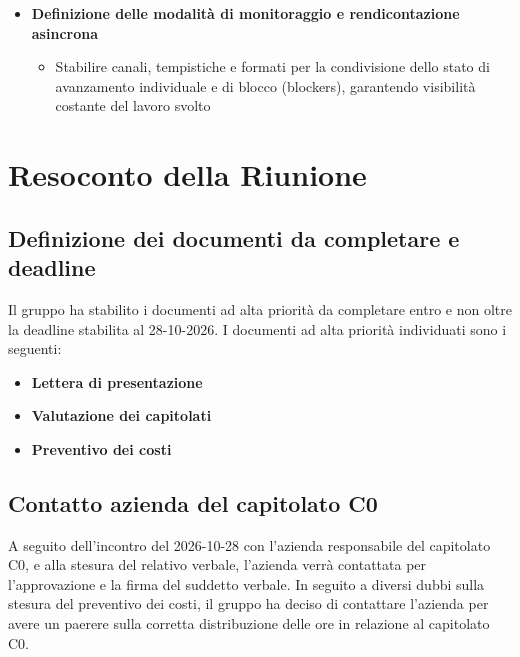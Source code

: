 \documentclass[11pt, a4paper]{article}
\begin{document}
\begin{itemize}
        \begin{itemize}
            \item Individuazione di fasce orarie fisse e ricorrenti per gli incontri di allineamento interno e per gli stati di avanzamento con gli stakeholder esterni
        \end{itemize}
    \item \textbf{Definizione delle modalità di monitoraggio e rendicontazione asincrona}
        \begin{itemize}
            \item Stabilire canali, tempistiche e formati per la condivisione dello stato di avanzamento individuale e di blocco (blockers), garantendo visibilità costante del lavoro svolto
        \end{itemize}
\end{itemize}

\section{Resoconto della Riunione}

\subsection{Definizione dei documenti da completare e deadline}
Il gruppo ha stabilito i documenti ad alta priorità da completare entro e non oltre la deadline stabilita al 28-10-2026. I documenti ad alta priorità individuati sono i seguenti:
\begin{itemize}
    \item \textbf{Lettera di presentazione}
    \item \textbf{Valutazione dei capitolati} 
    \item \textbf{Preventivo dei costi}
\end{itemize}

\subsection{Contatto azienda del capitolato C0}
A seguito dell'incontro del 2026-10-28 con l'azienda responsabile del capitolato C0, e alla stesura del relativo verbale, l'azienda verrà contattata per l'approvazione e la firma del suddetto verbale. In seguito a diversi dubbi sulla stesura del preventivo dei costi, il gruppo ha deciso di contattare l'azienda per avere un paerere sulla corretta distribuzione delle ore in relazione al capitolato C0.
\end{document}
